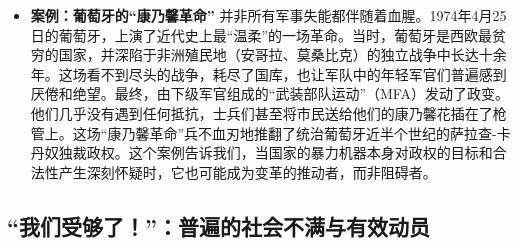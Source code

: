 \begin{itemize}
\begin{itemize}
    \item \textbf{案例：葡萄牙的“康乃馨革命”}
        并非所有军事失能都伴随着血腥。1974年4月25日的葡萄牙，上演了近代史上最“温柔”的一场革命。当时，葡萄牙是西欧最贫穷的国家，并深陷于非洲殖民地（安哥拉、莫桑比克）的独立战争中长达十余年。这场看不到尽头的战争，耗尽了国库，也让军队中的年轻军官们普遍感到厌倦和绝望。最终，由下级军官组成的“武装部队运动”（MFA）发动了政变。他们几乎没有遇到任何抵抗，士兵们甚至将市民送给他们的康乃馨花插在了枪管上。这场“康乃馨革命”兵不血刃地推翻了统治葡萄牙近半个世纪的萨拉查-卡丹奴独裁政权。这个案例告诉我们，当国家的暴力机器本身对政权的目标和合法性产生深刻怀疑时，它也可能成为变革的推动者，而非阻碍者。
    \end{itemize}
\end{itemize}

\subsection{ “我们受够了！”：普遍的社会不满与有效动员}

